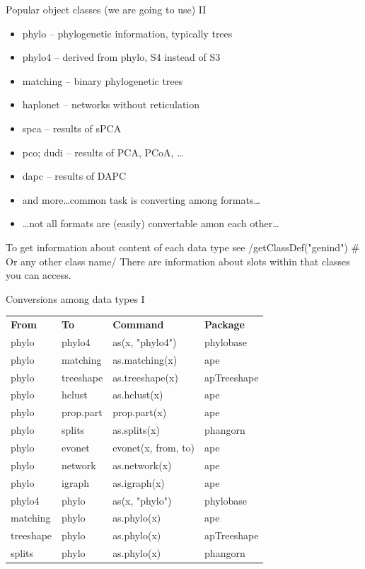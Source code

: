 \documentclass[compress, ucs, xelatex, 11pt, xcolor=svgnames,
  hyperref={
    bookmarks=true,
    unicode=true,
    colorlinks=true,
    pdftitle={Molecular data in R},
    plainpages=false,
    pdfauthor={Vojtech Zeisek},
    pdfsubject={Course about phylogeny and evolution in R},
    pdfcreator={XeLaTeX},
    pdfkeywords={R, evolution, phylogeny, molecular data},
    linkcolor=Tomato,
    anchorcolor=SaddleBrown,
    citecolor=Goldenrod,
    filecolor=DarkMagenta,
    menucolor=Sienna,
    urlcolor=DarkTurquoise,
    pdftex},
  url={hyphens, lowtilde} %
  ]{beamer}
\begin{document}
\begin{frame}[fragile]{Popular object classes (we are going to use) II}
\begin{itemize}
 \item phylo -- phylogenetic information, typically trees
 \item phylo4 -- derived from phylo, S4 instead of S3
 \item matching -- binary phylogenetic trees
 \item haplonet -- networks without reticulation
 \item spca -- results of sPCA
 \item pco; dudi -- results of PCA, PCoA, \ldots
 \item dapc -- results of DAPC
 \item and more\ldots common task is converting among formats\ldots
 \item \ldots not all formats are (easily) convertable amon each other\ldots
\end{itemize}
To get information about content of each data type see
\splus/getClassDef("genind") # Or any other class name/
There are information about slots within that classes you can access.
\end{frame}

\begin{frame}{Conversions among data types I}
  \begin{tabular}{llll}
    \textbf{From} & \textbf{To} & \textbf{Command} & \textbf{Package}\\
    phylo & phylo4 & as(x, "phylo4") & phylobase\\
    phylo & matching & as.matching(x) & ape\\
    phylo & treeshape & as.treeshape(x) & apTreeshape\\
    phylo & hclust & as.hclust(x) & ape\\
    phylo & prop.part & prop.part(x) & ape\\
    phylo & splits & as.splits(x) & phangorn\\
    phylo & evonet & evonet(x, from, to) & ape\\
    phylo & network & as.network(x) & ape\\
    phylo & igraph & as.igraph(x) & ape\\
    phylo4 & phylo & as(x, "phylo") & phylobase\\
    matching & phylo & as.phylo(x) & ape\\
    treeshape & phylo & as.phylo(x) & apTreeshape\\
    splits & phylo & as.phylo(x) & phangorn
  \end{tabular}
\end{frame}
\end{document}

